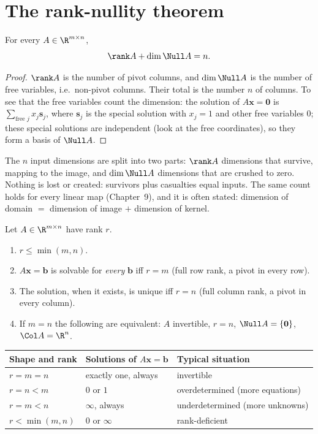 \section{The rank-nullity theorem}

\begin{theorem}\label{thm:ranknull}
For every $A\in\R^{m\times n}$,
\[ \rank A+\dim\Null A=n. \]
\end{theorem}

\begin{proof}
$\rank A$ is the number of pivot columns, and $\dim\Null A$ is the number of free variables, i.e.\ non-pivot columns. Their total is the number $n$ of columns. To see that the free variables count the dimension: the solution of $A\mathbf{x}=\mathbf{0}$ is $\sum_{\text{free }j}x_j\mathbf{s}_j$, where $\mathbf{s}_j$ is the special solution with $x_j=1$ and other free variables $0$; these special solutions are independent (look at the free coordinates), so they form a basis of $\Null A$.
\end{proof}

\begin{intuition}
The $n$ input dimensions are split into two parts: $\rank A$ dimensions that survive, mapping to the image, and $\dim\Null A$ dimensions that are crushed to zero. Nothing is lost or created: survivors plus casualties equal inputs. The same count holds for every linear map (Chapter~9), and it is often stated: dimension of domain $=$ dimension of image $+$ dimension of kernel.
\end{intuition}

\begin{theorem}\label{thm:rankconseq}
Let $A\in\R^{m\times n}$ have rank $r$.
\begin{enumerate}[label=(\roman*)]
  \item $r\le\min(m,n)$.
  \item $A\mathbf{x}=\mathbf{b}$ is solvable for \emph{every} $\mathbf{b}$ iff $r=m$ (full row rank, a pivot in every row).
  \item The solution, when it exists, is unique iff $r=n$ (full column rank, a pivot in every column).
  \item If $m=n$ the following are equivalent: $A$ invertible, $r=n$, $\Null A=\{\mathbf{0}\}$, $\Col A=\R^n$.
\end{enumerate}
\end{theorem}

\begin{center}
\begin{tabular}{lll}
\toprule
Shape and rank & Solutions of $A\mathbf{x}=\mathbf{b}$ & Typical situation \\
\midrule
$r=m=n$ & exactly one, always & invertible \\
$r=n<m$ & $0$ or $1$ & overdetermined (more equations) \\
$r=m<n$ & $\infty$, always & underdetermined (more unknowns) \\
$r<\min(m,n)$ & $0$ or $\infty$ & rank-deficient \\
\bottomrule
\end{tabular}
\end{center}

